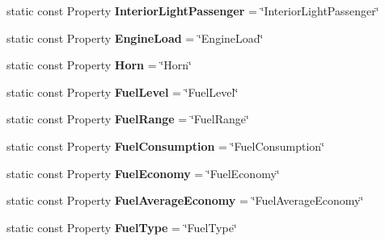 \begin{DoxyCompactItemize}
\item 
\hypertarget{classVehicleProperty_af60682429c3b2c7517715801d4ac0f92}{static const Property {\bfseries Interior\-Light\-Passenger} = \char`\"{}Interior\-Light\-Passenger\char`\"{}}\label{classVehicleProperty_af60682429c3b2c7517715801d4ac0f92}

\item 
\hypertarget{classVehicleProperty_a89cb1e6e8dcb7910270c333d79200665}{static const Property {\bfseries Engine\-Load} = \char`\"{}Engine\-Load\char`\"{}}\label{classVehicleProperty_a89cb1e6e8dcb7910270c333d79200665}

\item 
\hypertarget{classVehicleProperty_a69370e86d3520734d83a4c154b533642}{static const Property {\bfseries Horn} = \char`\"{}Horn\char`\"{}}\label{classVehicleProperty_a69370e86d3520734d83a4c154b533642}

\item 
\hypertarget{classVehicleProperty_a9bfbe5beb9e13c8de62c7514b3b22fc9}{static const Property {\bfseries Fuel\-Level} = \char`\"{}Fuel\-Level\char`\"{}}\label{classVehicleProperty_a9bfbe5beb9e13c8de62c7514b3b22fc9}

\item 
\hypertarget{classVehicleProperty_ae0c98c8cbfb6b8553faabfb9d4a42b35}{static const Property {\bfseries Fuel\-Range} = \char`\"{}Fuel\-Range\char`\"{}}\label{classVehicleProperty_ae0c98c8cbfb6b8553faabfb9d4a42b35}

\item 
\hypertarget{classVehicleProperty_afdc1b7b9ecf211d26221b155aef9a35a}{static const Property {\bfseries Fuel\-Consumption} = \char`\"{}Fuel\-Consumption\char`\"{}}\label{classVehicleProperty_afdc1b7b9ecf211d26221b155aef9a35a}

\item 
\hypertarget{classVehicleProperty_af34bb142d87eb300ce82e112598d5376}{static const Property {\bfseries Fuel\-Economy} = \char`\"{}Fuel\-Economy\char`\"{}}\label{classVehicleProperty_af34bb142d87eb300ce82e112598d5376}

\item 
\hypertarget{classVehicleProperty_aa453a0e6b9edee8da30b1f5b9a32edeb}{static const Property {\bfseries Fuel\-Average\-Economy} = \char`\"{}Fuel\-Average\-Economy\char`\"{}}\label{classVehicleProperty_aa453a0e6b9edee8da30b1f5b9a32edeb}

\item 
\hypertarget{classVehicleProperty_a2df3b5ff14ec4a92fba65ad72be7d5b7}{static const Property {\bfseries Fuel\-Type} = \char`\"{}Fuel\-Type\char`\"{}}\label{classVehicleProperty_a2df3b5ff14ec4a92fba65ad72be7d5b7}


\end{DoxyCompactItemize}
